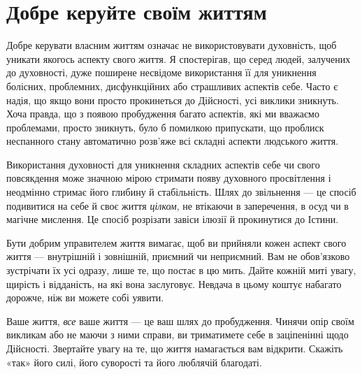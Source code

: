 \section*{Добре керуйте своїм життям}

Добре керувати власним життям означає не використовувати духовність, щоб уникати якогось аспекту свого життя. Я спостерігав, що серед людей, залучених до духовності, дуже поширене несвідоме використання її для уникнення болісних, проблемних, дисфункційних або страшливих аспектів себе. Часто є надія, що якщо вони просто прокинеться до Дійсності, усі виклики зникнуть. Хоча правда, що з появою пробудження багато аспектів, які ми вважаємо проблемами, просто зникнуть, було б помилкою припускати, що проблиск неспанного стану автоматично розв'яже всі складні аспекти людського життя.

Використання духовності для уникнення складних аспектів себе чи свого повсякдення може значною мірою стримати появу духовного просвітлення і неодмінно стримає його глибину й стабільність. Шлях до звільнення — це спосіб подивитися на себе й своє життя \emph{цілком}, не втікаючи в заперечення, в осуд чи в магічне мислення. Це спосіб розрізати завіси ілюзії й прокинутися до Істини.

Бути добрим управителем життя вимагає, щоб ви прийняли кожен аспект свого життя — внутрішній і зовнішній, приємний чи неприємний. Вам не обов'язково зустрічати їх усі одразу, лише те, що постає в цю мить. Дайте кожній миті увагу, щирість і відданість, на які вона заслуговує. Невдача в цьому коштує набагато дорожче, ніж ви можете собі уявити.

Ваше життя, \emph{все} ваше життя — це ваш шлях до пробудження. Чинячи опір своїм викликам або не маючи з ними справи, ви триматимете себе в заціпенінні щодо Дійсності. Звертайте увагу на те, що життя намагається вам відкрити. Скажіть «так» його силі, його суворості та його люблячій благодаті.
